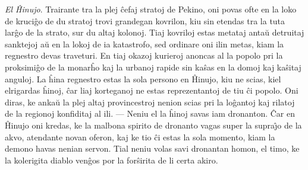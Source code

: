 \emph{El \^Hinujo}. Trairante tra la plej \^cefaj stratoj de Pekino,
oni povas ofte en la loko de kruci\^go de du stratoj trovi grandegan
kovrilon, kiu sin etendas tra la tuta lar\^go de la strato, sur du
altaj kolonoj. Tiaj kovriloj estas metataj anta\u u detruitaj
sanktejoj a\u u en la lokoj de ia katastrofo, sed ordinare oni ilin
metas, kiam la regnestro devas traveturi. En tiaj okazoj kurieroj
anoncas al la popolo pri la proksimi\^go de la monar\^ho kaj la
urbanoj rapide sin ka\^sas en la domoj kaj ka\^sitaj anguloj. La
\^hina regnestro estas la sola persono en \^Hinujo, kiu ne scias,
kiel elrigardas \^hinoj, \^car liaj korteganoj ne estas
reprezentantoj de tiu \^ci popolo. Oni diras, ke anka\u u la plej
altaj provincestroj nenion scias pri la lo\^gantoj kaj rilatoj de la
regionoj konfiditaj al ili. --- Neniu el la \^hinoj savas iam
dronanton. \^Car en \^Hinujo oni kredas, ke la malbona spirito de
dronanto vagas super la supra\^{\j}o de la akvo, atendante novan
oferon, kaj ke tio \^ci estas la sola momento, kiam la demono havas
nenian servon. Tial neniu volas savi dronantan homon, el timo, ke la
kolerigita diablo ven\^gos por la for\^sirita de li certa akiro.

